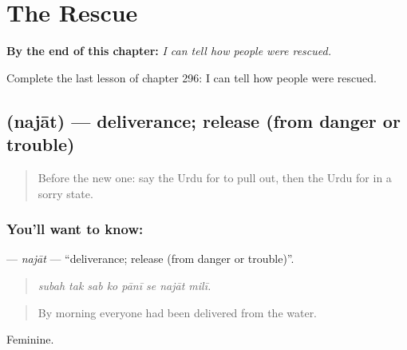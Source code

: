 
\chapter{The Rescue}
\label{ch:ur-the-rescue}

\begin{chapteropening}
\textbf{By the end of this chapter:} \emph{I can tell how people were rescued.}

Complete the last lesson of chapter 296: I can tell how people were rescued.
\end{chapteropening}

\section[\texorpdfstring{\ur{نجات} (najāt)}{نجات (najāt)}]{ (najāt) — deliverance; release (from danger or trouble)}

\label{lesson:UR-C296-najat}



\begin{quote}
Before the new one: say the Urdu for to pull out, then the Urdu for in a sorry state.
\end{quote}

\subsection*{You'll want to know: }
\textbf{} — \emph{najāt} — \textquotedblleft{}deliverance; release (from danger or trouble)\textquotedblright{}.

\begin{quote}
       
\end{quote}

\begin{quote}
\emph{subah tak sab ko pānī se najāt milī.}
\end{quote}

\begin{quote}
By morning everyone had been delivered from the water.
\end{quote}

Feminine.

